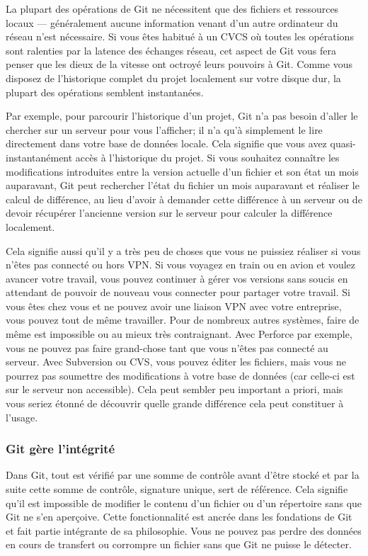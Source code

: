 La plupart des opérations de Git ne nécessitent que des fichiers et ressources locaux  --- généralement aucune information venant d'un autre ordinateur du réseau n'est nécessaire.
Si vous êtes habitué à un CVCS où toutes les opérations sont ralenties par la latence des échanges réseau, cet aspect de Git vous fera penser que les dieux de la vitesse ont octroyé leurs pouvoirs à Git.
Comme vous disposez de l'historique complet du projet localement sur votre disque dur, la plupart des opérations semblent instantanées.

Par exemple, pour parcourir l'historique d'un projet, Git n'a pas besoin d'aller le chercher sur un serveur pour vous l'afficher;
il n'a qu'à simplement le lire directement dans votre base de données locale.
Cela signifie que vous avez quasi-instantanément accès à l'historique du projet.
Si vous souhaitez connaître les modifications introduites entre la version actuelle d'un fichier et son état un mois auparavant, Git peut rechercher l'état du fichier un mois auparavant et réaliser le calcul de différence, au lieu d'avoir à demander cette différence à un serveur ou de devoir récupérer l'ancienne version sur le serveur pour calculer la différence localement.

Cela signifie aussi qu'il y a très peu de choses que vous ne puissiez réaliser si vous n'êtes pas connecté ou hors VPN.
Si vous voyagez en train ou en avion et voulez avancer votre travail, vous pouvez continuer à gérer vos versions sans soucis en attendant de pouvoir de nouveau vous connecter pour partager votre travail.
Si vous êtes chez vous et ne pouvez avoir une liaison VPN avec votre entreprise, vous pouvez tout de même travailler.
Pour de nombreux autres systèmes, faire de même est impossible ou au mieux très contraignant.
Avec Perforce par exemple, vous ne pouvez pas faire grand-chose tant que vous n'êtes pas connecté au serveur.
Avec Subversion ou CVS, vous pouvez éditer les fichiers, mais vous ne pourrez pas soumettre des modifications à votre base de données (car celle-ci est sur le serveur non accessible).
Cela peut sembler peu important a priori, mais vous seriez étonné de découvrir quelle grande différence cela peut constituer à l'usage.

\subsubsection{Git gère l'intégrité}

Dans Git, tout est vérifié par une somme de contrôle avant d'être stocké et par la suite cette somme de contrôle, signature unique, sert de référence.
Cela signifie qu'il est impossible de modifier le contenu d'un fichier ou d'un répertoire sans que Git ne s'en aperçoive.
Cette fonctionnalité est ancrée dans les fondations de Git et fait partie intégrante de sa philosophie.
Vous ne pouvez pas perdre des données en cours de transfert ou corrompre un fichier sans que Git ne puisse le détecter.

